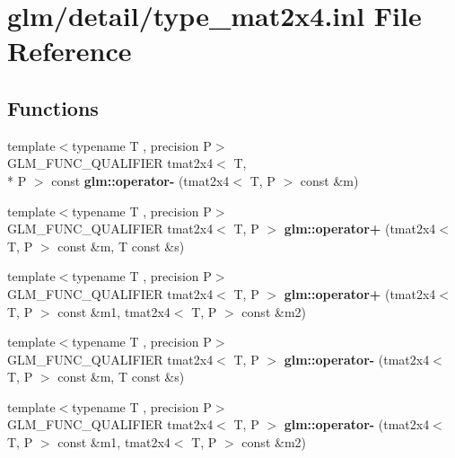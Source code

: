 \hypertarget{type__mat2x4_8inl}{\section{glm/detail/type\-\_\-mat2x4.inl File Reference}
\label{type__mat2x4_8inl}
}
\subsection*{Functions}
\begin{DoxyCompactItemize}
\item 
\hypertarget{namespaceglm_aed8a66373e171843d453460a5f774068}{{\footnotesize template$<$typename T , precision P$>$ }\\G\-L\-M\-\_\-\-F\-U\-N\-C\-\_\-\-Q\-U\-A\-L\-I\-F\-I\-E\-R tmat2x4$<$ T, \\*
P $>$ const {\bfseries glm\-::operator-\/} (tmat2x4$<$ T, P $>$ const \&m)}\label{namespaceglm_aed8a66373e171843d453460a5f774068}

\item 
\hypertarget{namespaceglm_aecf1d857d72523972e8385ebf10ad896}{{\footnotesize template$<$typename T , precision P$>$ }\\G\-L\-M\-\_\-\-F\-U\-N\-C\-\_\-\-Q\-U\-A\-L\-I\-F\-I\-E\-R tmat2x4$<$ T, P $>$ {\bfseries glm\-::operator+} (tmat2x4$<$ T, P $>$ const \&m, T const \&s)}\label{namespaceglm_aecf1d857d72523972e8385ebf10ad896}

\item 
\hypertarget{namespaceglm_ad38e1685b1567e6b9085d474b7331b92}{{\footnotesize template$<$typename T , precision P$>$ }\\G\-L\-M\-\_\-\-F\-U\-N\-C\-\_\-\-Q\-U\-A\-L\-I\-F\-I\-E\-R tmat2x4$<$ T, P $>$ {\bfseries glm\-::operator+} (tmat2x4$<$ T, P $>$ const \&m1, tmat2x4$<$ T, P $>$ const \&m2)}\label{namespaceglm_ad38e1685b1567e6b9085d474b7331b92}

\item 
\hypertarget{namespaceglm_afd47ae08641e9193948066f714596f2c}{{\footnotesize template$<$typename T , precision P$>$ }\\G\-L\-M\-\_\-\-F\-U\-N\-C\-\_\-\-Q\-U\-A\-L\-I\-F\-I\-E\-R tmat2x4$<$ T, P $>$ {\bfseries glm\-::operator-\/} (tmat2x4$<$ T, P $>$ const \&m, T const \&s)}\label{namespaceglm_afd47ae08641e9193948066f714596f2c}

\item 
\hypertarget{namespaceglm_ab0e4ee4a08d22d35213dd50729bbfd3c}{{\footnotesize template$<$typename T , precision P$>$ }\\G\-L\-M\-\_\-\-F\-U\-N\-C\-\_\-\-Q\-U\-A\-L\-I\-F\-I\-E\-R tmat2x4$<$ T, P $>$ {\bfseries glm\-::operator-\/} (tmat2x4$<$ T, P $>$ const \&m1, tmat2x4$<$ T, P $>$ const \&m2)}\label{namespaceglm_ab0e4ee4a08d22d35213dd50729bbfd3c}


\end{DoxyCompactItemize}
